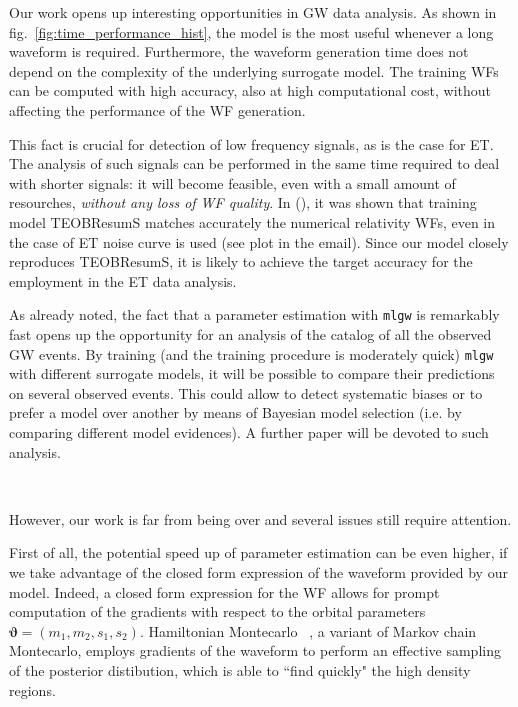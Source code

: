 \par
Our work opens up interesting opportunities in GW data analysis.
As shown in fig.~\ref{fig:time_performance_hist}, the model is the most useful whenever a long waveform is required. Furthermore, the waveform generation time does not depend on the complexity of the underlying surrogate model. The training WFs can be computed with high accuracy, also at high computational cost, without affecting the performance of the WF generation.
\par
This fact is crucial for detection of low frequency signals, as is the case for ET. The analysis of such signals can be performed in the same time required to deal with shorter signals: it will become feasible, even with a small amount of resourches, \textit{without any loss of WF quality}.
In \cite{} (), it was shown that training model TEOBResumS matches accurately the numerical relativity WFs, even in the case of ET noise curve is used (see plot in the email). Since our model closely reproduces TEOBResumS, it is likely to achieve the target accuracy for the employment in the ET data analysis.
\par
As already noted, the fact that a parameter estimation with \texttt{mlgw} is remarkably fast opens up the opportunity for an analysis of the catalog of all the observed GW events.
By training (and the training procedure is moderately quick) \texttt{mlgw} with different surrogate models, it will be possible to compare their predictions on several observed events. This could allow to detect systematic biases or to prefer a model over another by means of Bayesian model selection (i.e. by comparing different model evidences).
A further paper will be devoted to such analysis.
\par
{}\\
\par
However, our work is far from being over and several issues still require attention.
\par
First of all, the potential speed up of parameter estimation can be even higher, if we take advantage of the closed form expression of the waveform provided by our model.
Indeed, a closed form expression for the WF allows for prompt computation of the gradients with respect to the orbital parameters $ \boldsymbol{\vartheta} = (m_1,m_2, {s}_1,{s}_2) $.
Hamiltonian Montecarlo \cite{betancourt2017hamiltonianMC}~\cite{Porter2014Hamiltonian_MonteCarlo}, a variant of Markov chain Montecarlo, employs gradients of the waveform to perform an effective sampling of the posterior distibution, which is able to ``find quickly" the high density regions.
